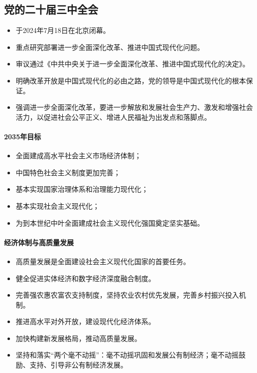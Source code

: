 \documentclass[12pt,a4paper]{ctexart}
\begin{document}
\subsection*{党的二十届三中全会}

\begin{itemize}
\item 于2024年7月18日在北京闭幕。
\item 重点研究部署进一步全面深化改革、推进中国式现代化问题。
\item 审议通过《中共中央关于进一步全面深化改革、推进中国式现代化的决定》。
\item 明确改革开放是中国式现代化的必由之路，党的领导是中国式现代化的根本保证。
\item 强调进一步全面深化改革，要进一步解放和发展社会生产力、激发和增强社会活力，以促进社会公平正义、增进人民福祉为出发点和落脚点。
\end{itemize}

\paragraph{2035年目标}

\begin{itemize}
\item 全面建成高水平社会主义市场经济体制；
\item 中国特色社会主义制度更加完善；
\item 基本实现国家治理体系和治理能力现代化；
\item 基本实现社会主义现代化；
\item 为到本世纪中叶全面建成社会主义现代化强国奠定坚实基础。
\end{itemize}

\paragraph{经济体制与高质量发展}

\begin{itemize}
\item 高质量发展是全面建设社会主义现代化国家的首要任务。
\item 健全促进实体经济和数字经济深度融合制度。
\item 完善强农惠农富农支持制度，坚持农业农村优先发展，完善乡村振兴投入机制。
\item 推进高水平对外开放，建设现代化经济体系。
\item 加快构建新发展格局，推动高质量发展。
\item 坚持和落实“两个毫不动摇”：毫不动摇巩固和发展公有制经济；毫不动摇鼓励、支持、引导非公有制经济发展。
\end{itemize}
\end{document}
